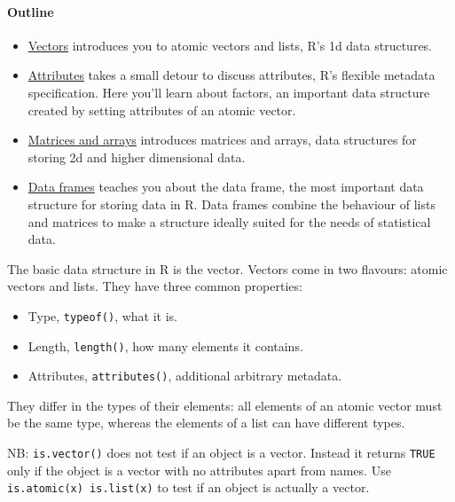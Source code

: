 \paragraph{Outline}

\begin{itemize}
\item
  \hyperref[vectors]{Vectors} introduces you to atomic vectors and
  lists, R's 1d data structures.
\item
  \hyperref[attributes]{Attributes} takes a small detour to discuss
  attributes, R's flexible metadata specification. Here you'll learn
  about factors, an important data structure created by setting
  attributes of an atomic vector.
\item
  \hyperref[matrices-and-arrays]{Matrices and arrays} introduces
  matrices and arrays, data structures for storing 2d and higher
  dimensional data.
\item
  \hyperref[data-frames]{Data frames} teaches you about the data frame,
  the most important data structure for storing data in R. Data frames
  combine the behaviour of lists and matrices to make a structure
  ideally suited for the needs of statistical data.
\end{itemize}


The basic data structure in R is the vector. Vectors come in two
flavours: atomic vectors and lists. They have three common properties:

\begin{itemize}
\itemsep1pt\parskip0pt
\item
  Type, \texttt{typeof()}, what it is.
\item
  Length, \texttt{length()}, how many elements it contains.
\item
  Attributes, \texttt{attributes()}, additional arbitrary metadata.
\end{itemize}

They differ in the types of their elements: all elements of an atomic
vector must be the same type, whereas the elements of a list can have
different types.

NB: \texttt{is.vector()} does not test if an object is a vector. Instead
it returns \texttt{TRUE} only if the object is a vector with no
attributes apart from names. Use
\texttt{is.atomic(x) \textbar{}\textbar{} is.list(x)} to test if an
object is actually a vector.

